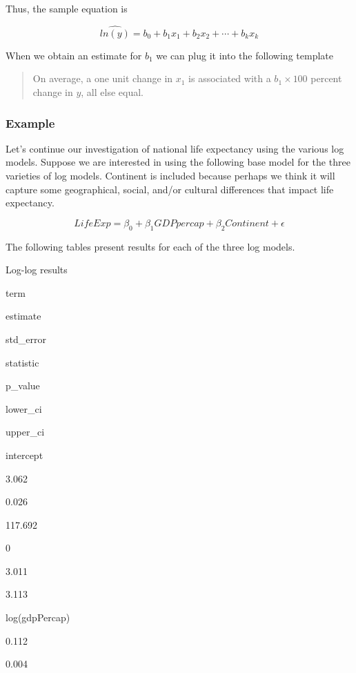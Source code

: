 \documentclass[
]{book}
\begin{document}
Thus, the sample equation is

\begin{equation}
\hat{ln(y)}=b_0 + b_1x_1 + b_2x_2 + \cdots + b_kx_k
\label{eq:loglevsamp}
\end{equation}

When we obtain an estimate for \(b_1\) we can plug it into the following template

\begin{quote}
On average, a one unit change in \(x_1\) is associated with a \(b_1 \times 100\) percent change in \(y\), all else equal.
\end{quote}

\hypertarget{example}{%
\subsubsection*{Example}\label{example}}

Let's continue our investigation of national life expectancy using the various log models. Suppose we are interested in using the following base model for the three varieties of log models. Continent is included because perhaps we think it will capture some geographical, social, and/or cultural differences that impact life expectancy.

\begin{equation}
LifeExp=\beta_0 + \beta_1GDPpercap + \beta_2Continent + \epsilon
\label{eq:logex}
\end{equation}

The following tables present results for each of the three log models.

\label{tab:loglogtab}Log-log results

term

estimate

std\_error

statistic

p\_value

lower\_ci

upper\_ci

intercept

3.062

0.026

117.692

0

3.011

3.113

log(gdpPercap)

0.112

0.004
\end{document}
